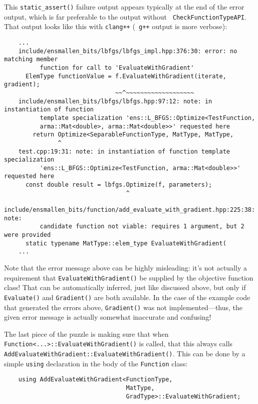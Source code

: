 This {\tt static\_assert()} failure output appears typically at the end of the
error output, which is far preferable to the output without {\tt
CheckFunctionTypeAPI}.  That output looks like this with {\tt clang++} ({\tt
g++} output is more verbose):

\begin{verbatim}
    ...
    include/ensmallen_bits/lbfgs/lbfgs_impl.hpp:376:30: error: no matching member
          function for call to 'EvaluateWithGradient'
      ElemType functionValue = f.EvaluateWithGradient(iterate, gradient);
                               ~~^~~~~~~~~~~~~~~~~~~~
    include/ensmallen_bits/lbfgs/lbfgs.hpp:97:12: note: in instantiation of function
          template specialization 'ens::L_BFGS::Optimize<TestFunction,
          arma::Mat<double>, arma::Mat<double>>' requested here
        return Optimize<SeparableFunctionType, MatType, MatType,
               ^
    test.cpp:19:31: note: in instantiation of function template specialization
          'ens::L_BFGS::Optimize<TestFunction, arma::Mat<double>>' requested here
      const double result = lbfgs.Optimize(f, parameters);
                                  ^
    include/ensmallen_bits/function/add_evaluate_with_gradient.hpp:225:38: note: 
          candidate function not viable: requires 1 argument, but 2 were provided
      static typename MatType::elem_type EvaluateWithGradient(
    ...
\end{verbatim}

Note that the error message above can be highly misleading: it's not actually a
requirement that {\tt EvaluateWithGradient()} be supplied by the objective
function class!  That can be automatically inferred, just like discussed above,
but only if {\tt Evaluate()} and {\tt Gradient()} are both available.  In the
case of the example code that generated the errors above, {\tt Gradient()} was
not implemented---thus, the given error message is actually somewhat inaccurate
and confusing!

The last piece of the puzzle is making sure that when {\tt
Function<...>::EvaluateWithGradient()} is called, that this always calls {\tt
AddEvaluateWithGradient::EvaluateWithGradient()}.  This can be done by a simple
{\tt using} declaration in the body of the {\tt Function} class:

\begin{verbatim}
    using AddEvaluateWithGradient<FunctionType,
                                  MatType,
                                  GradType>::EvaluateWithGradient;
\end{verbatim}

